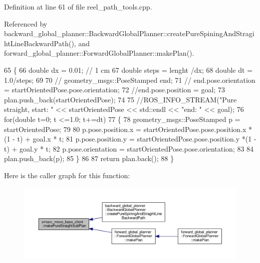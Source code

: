 Definition at line 61 of file reel\+\_\+path\+\_\+tools.\+cpp.



Referenced by backward\+\_\+global\+\_\+planner\+::\+Backward\+Global\+Planner\+::create\+Pure\+Spining\+And\+Stragiht\+Line\+Backward\+Path(), and forward\+\_\+global\+\_\+planner\+::\+Forward\+Global\+Planner\+::make\+Plan().


\begin{DoxyCode}
65     \{
66         \textcolor{keywordtype}{double} dx = 0.01; \textcolor{comment}{// 1 cm}
67         \textcolor{keywordtype}{double} steps = lenght /dx;
68         \textcolor{keywordtype}{double} dt = 1.0/steps;
69 
70         \textcolor{comment}{// geometry\_msgs::PoseStamped end;}
71         \textcolor{comment}{// end.pose.orientation = startOrientedPose.pose.orientation;}
72         \textcolor{comment}{//end.pose.position = goal;}
73         plan.push\_back(startOrientedPose);
74 
75         \textcolor{comment}{//ROS\_INFO\_STREAM("Pure straight, start: " << startOrientedPose << std::endl << "end: " << goal);}
76         \textcolor{keywordflow}{for}(\textcolor{keywordtype}{double} t=0; t <=1.0; t+=dt)
77         \{
78             geometry\_msgs::PoseStamped p = startOrientedPose;
79             
80             p.pose.position.x =  startOrientedPose.pose.position.x *(1 - t) + goal.x * t;
81             p.pose.position.y =  startOrientedPose.pose.position.y *(1 - t) + goal.y * t;
82             p.pose.orientation = startOrientedPose.pose.orientation;
83             
84             plan.push\_back(p);
85         \}
86     
87         \textcolor{keywordflow}{return} plan.back();
88     \}
\end{DoxyCode}


Here is the caller graph for this function\+:
\nopagebreak
\begin{figure}[H]
\begin{center}
\leavevmode
\includegraphics[width=350pt]{namespacesmacc__move__base__client_a75b92d6b95689fb8f73cdca23291fdb9_icgraph}
\end{center}
\end{figure}


